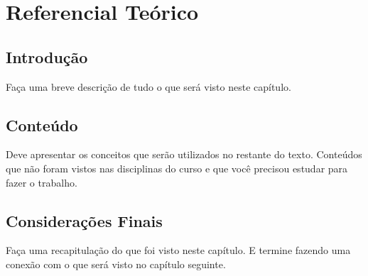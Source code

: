 \chapter{Referencial Teórico}
\label{ch:referencial}

\section{Introdução}
Faça uma breve descrição de tudo o que será visto neste capítulo.

\section{Conteúdo}
Deve apresentar os conceitos que serão utilizados no restante do texto. Conteúdos que não foram vistos nas disciplinas do curso e que você precisou estudar para fazer o trabalho.

\section{Considerações Finais}
Faça uma recapitulação do que foi visto neste capítulo. E termine fazendo uma conexão com o que será visto no capítulo seguinte.